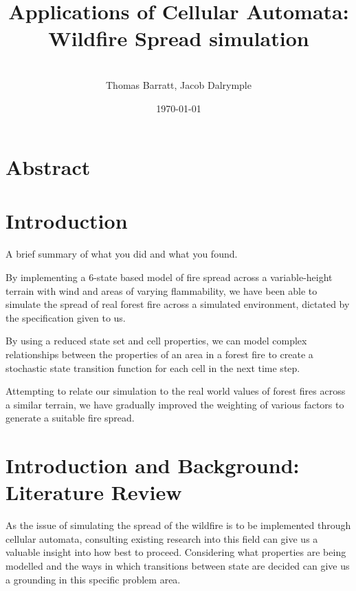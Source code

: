 \documentclass[11pt, a4paper, titlepage]{article}
\date{}
\title{ \textbf{Applications of Cellular Automata: Wildfire Spread simulation} \\  }
\author{\\ \Large{Thomas Barratt, Jacob Dalrymple  } }
\date{\today}
\begin{document}
\maketitle

\newpage

\section{Abstract}

\section{Introduction}

\begin{displayquote}
  A brief summary of what you did and what you found.
\end{displayquote}
By implementing a 6-state based model of fire spread across a variable-height terrain with wind and areas of varying flammability, we have been able to simulate the spread of real forest fire across a simulated environment, dictated by the specification given to us.

By using a reduced state set and cell properties, we can model complex relationships between the properties of an area in a forest fire to create a stochastic state transition function for each cell in the next time step. 

Attempting to relate our simulation to the real world values of forest fires across a similar terrain, we have gradually improved the weighting of various factors to generate a suitable fire spread.

\section{Introduction and Background: Literature Review}
As the issue of simulating the spread of the wildfire is to be implemented through cellular automata, consulting existing research into this field can give us a valuable insight into how best to proceed. Considering what properties are being modelled and the ways in which transitions between state are decided can give us a grounding in this specific problem area.
\end{document}
